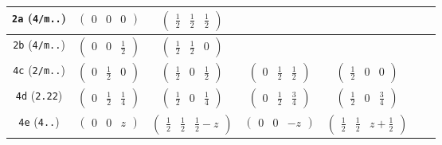\documentclass[fleqn,9pt,landscape]{jsarticle}
\begin{document}
\begin{center}
\begin{longtable}{ccccccc}
{\tt 2a} ({\tt 4/m..}) & $ \begin{pmatrix} 0 & 0 & 0 \end{pmatrix} $ & $ \begin{pmatrix} \frac{1}{2} & \frac{1}{2} & \frac{1}{2} \end{pmatrix} $ & $  $ & $  $ & $  $ & $  $ \\ \hline
{\tt 2b} ({\tt 4/m..}) & $ \begin{pmatrix} 0 & 0 & \frac{1}{2} \end{pmatrix} $ & $ \begin{pmatrix} \frac{1}{2} & \frac{1}{2} & 0 \end{pmatrix} $ & $  $ & $  $ & $  $ & $  $ \\ \hline
{\tt 4c} ({\tt 2/m..}) & $ \begin{pmatrix} 0 & \frac{1}{2} & 0 \end{pmatrix} $ & $ \begin{pmatrix} \frac{1}{2} & 0 & \frac{1}{2} \end{pmatrix} $ & $ \begin{pmatrix} 0 & \frac{1}{2} & \frac{1}{2} \end{pmatrix} $ & $ \begin{pmatrix} \frac{1}{2} & 0 & 0 \end{pmatrix} $ & $  $ & $  $ \\ \hline
{\tt 4d} ({\tt 2.22}) & $ \begin{pmatrix} 0 & \frac{1}{2} & \frac{1}{4} \end{pmatrix} $ & $ \begin{pmatrix} \frac{1}{2} & 0 & \frac{1}{4} \end{pmatrix} $ & $ \begin{pmatrix} 0 & \frac{1}{2} & \frac{3}{4} \end{pmatrix} $ & $ \begin{pmatrix} \frac{1}{2} & 0 & \frac{3}{4} \end{pmatrix} $ & $  $ & $  $ \\ \hline
{\tt 4e} ({\tt 4..}) & $ \begin{pmatrix} 0 & 0 & z \end{pmatrix} $ & $ \begin{pmatrix} \frac{1}{2} & \frac{1}{2} & \frac{1}{2} - z \end{pmatrix} $ & $ \begin{pmatrix} 0 & 0 & - z \end{pmatrix} $ & $ \begin{pmatrix} \frac{1}{2} & \frac{1}{2} & z + \frac{1}{2} \end{pmatrix} $ & $  $ & $  $ \\ \hline

\end{longtable}
\end{center}
\end{document}
